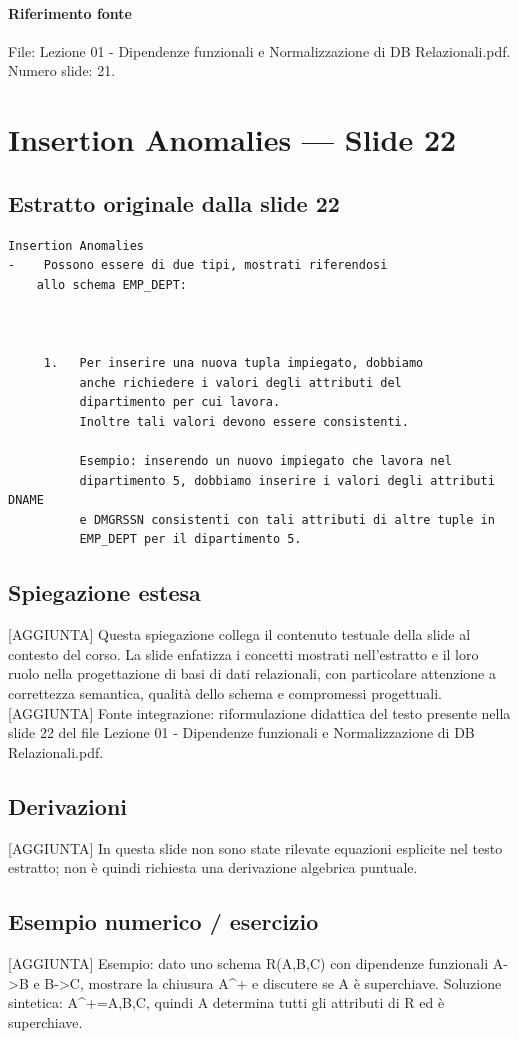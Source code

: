 \documentclass[11pt]{article}
\begin{document}
\paragraph{Riferimento fonte} File: Lezione 01 - Dipendenze funzionali e Normalizzazione di DB Relazionali.pdf. Numero slide: 21.
\section{Insertion Anomalies --- Slide 22}
\subsection*{Estratto originale dalla slide 22}
\begin{lstlisting}
Insertion Anomalies
-    Possono essere di due tipi, mostrati riferendosi
    allo schema EMP_DEPT:



     1.   Per inserire una nuova tupla impiegato, dobbiamo
          anche richiedere i valori degli attributi del
          dipartimento per cui lavora.
          Inoltre tali valori devono essere consistenti.

          Esempio: inserendo un nuovo impiegato che lavora nel
          dipartimento 5, dobbiamo inserire i valori degli attributi DNAME
          e DMGRSSN consistenti con tali attributi di altre tuple in
          EMP_DEPT per il dipartimento 5.
\end{lstlisting}
\subsection*{Spiegazione estesa}
[AGGIUNTA] Questa spiegazione collega il contenuto testuale della slide al contesto del corso. La slide enfatizza i concetti mostrati nell'estratto e il loro ruolo nella progettazione di basi di dati relazionali, con particolare attenzione a correttezza semantica, qualità dello schema e compromessi progettuali.
[AGGIUNTA] Fonte integrazione: riformulazione didattica del testo presente nella slide 22 del file Lezione 01 - Dipendenze funzionali e Normalizzazione di DB Relazionali.pdf.
\subsection*{Derivazioni}
[AGGIUNTA] In questa slide non sono state rilevate equazioni esplicite nel testo estratto; non è quindi richiesta una derivazione algebrica puntuale.
\subsection*{Esempio numerico / esercizio}
[AGGIUNTA] Esempio: dato uno schema R(A,B,C) con dipendenze funzionali A->B e B->C, mostrare la chiusura A^+ e discutere se A è superchiave. Soluzione sintetica: A^+={A,B,C}, quindi A determina tutti gli attributi di R ed è superchiave.
\end{document}
